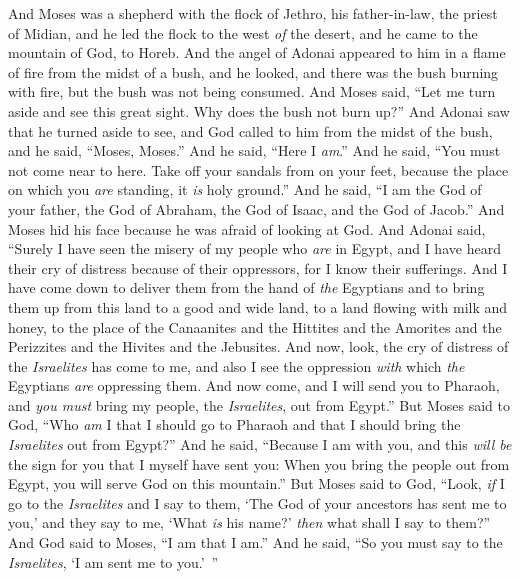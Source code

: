 \begin{biblechapter} %
 And Moses was a shepherd with the flock of Jethro, his father-in-law, the priest of Midian, and he led the flock to the west \textit{of} the desert, and he came to the mountain of God, to Horeb.
\verse And the angel of Adonai appeared to him in a flame of fire from the midst of a bush, and he looked, and there was the bush burning with fire, but the bush was not being consumed.
\verse And Moses said, “Let me turn aside and see this great sight. Why does the bush not burn up?”
\verse And Adonai saw that he turned aside to see, and God called to him from the midst of the bush, and he said, “Moses, Moses.” And he said, “Here I \textit{am}.”
\verse And he said, “You must not come near to here. Take off your sandals from on your feet, because the place on which you \textit{are} standing, it \textit{is} holy ground.”
\verse And he said, “I am the God of your father, the God of Abraham, the God of Isaac, and the God of Jacob.” And Moses hid his face because he was afraid of looking at God.
\verse And Adonai said, “Surely I have seen the misery of my people who \textit{are} in Egypt, and I have heard their cry of distress because of their oppressors, for I know their sufferings.
\verse And I have come down to deliver them from the hand of \textit{the} Egyptians and to bring them up from this land to a good and wide land, to a land flowing with milk and honey, to the place of the Canaanites and the Hittites and the Amorites and the Perizzites and the Hivites and the Jebusites.
\verse And now, look, the cry of distress of the \textit{Israelites} has come to me, and also I see the oppression \textit{with} which \textit{the} Egyptians \textit{are} oppressing them.
\verse And now come, and I will send you to Pharaoh, and \textit{you must} bring my people, the \textit{Israelites}, out from Egypt.”
\verse But Moses said to God, “Who \textit{am} I that I should go to Pharaoh and that I should bring the \textit{Israelites} out from Egypt?”
\verse And he said, “Because I am with you, and this \textit{will be} the sign for you that I myself have sent you: When you bring the people out from Egypt, you will serve God on this mountain.”
\verse But Moses said to God, “Look, \textit{if} I go to the \textit{Israelites} and I say to them, ‘The God of your ancestors has sent me to you,’ and they say to me, ‘What \textit{is} his name?’ \textit{then} what shall I say to them?”
\verse And God said to Moses, “I am that I am.” And he said, “So you must say to the \textit{Israelites}, ‘I am sent me to you.’ ”

\end{biblechapter}
